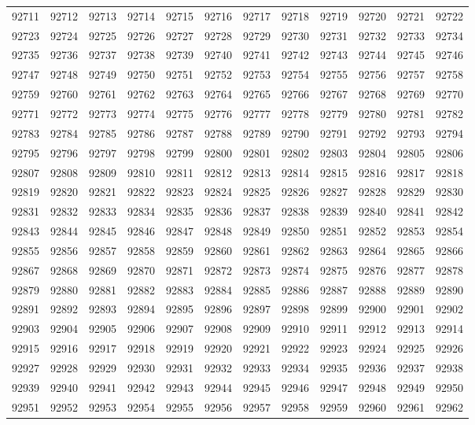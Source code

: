 \begin{center}
\begin{longtable}{llllllllllll}
92711 &92712 &92713 &92714 &92715 &92716 &92717 &92718 &92719 &92720 &92721 &92722 \\
92723 &92724 &92725 &92726 &92727 &92728 &92729 &92730 &92731 &92732 &92733 &92734 \\
92735 &92736 &92737 &92738 &92739 &92740 &92741 &92742 &92743 &92744 &92745 &92746 \\
92747 &92748 &92749 &92750 &92751 &92752 &92753 &92754 &92755 &92756 &92757 &92758 \\
92759 &92760 &92761 &92762 &92763 &92764 &92765 &92766 &92767 &92768 &92769 &92770 \\
92771 &92772 &92773 &92774 &92775 &92776 &92777 &92778 &92779 &92780 &92781 &92782 \\
92783 &92784 &92785 &92786 &92787 &92788 &92789 &92790 &92791 &92792 &92793 &92794 \\
92795 &92796 &92797 &92798 &92799 &92800 &92801 &92802 &92803 &92804 &92805 &92806 \\
92807 &92808 &92809 &92810 &92811 &92812 &92813 &92814 &92815 &92816 &92817 &92818 \\
92819 &92820 &92821 &92822 &92823 &92824 &92825 &92826 &92827 &92828 &92829 &92830 \\
92831 &92832 &92833 &92834 &92835 &92836 &92837 &92838 &92839 &92840 &92841 &92842 \\
92843 &92844 &92845 &92846 &92847 &92848 &92849 &92850 &92851 &92852 &92853 &92854 \\
92855 &92856 &92857 &92858 &92859 &92860 &92861 &92862 &92863 &92864 &92865 &92866 \\
92867 &92868 &92869 &92870 &92871 &92872 &92873 &92874 &92875 &92876 &92877 &92878 \\
92879 &92880 &92881 &92882 &92883 &92884 &92885 &92886 &92887 &92888 &92889 &92890 \\
92891 &92892 &92893 &92894 &92895 &92896 &92897 &92898 &92899 &92900 &92901 &92902 \\
92903 &92904 &92905 &92906 &92907 &92908 &92909 &92910 &92911 &92912 &92913 &92914 \\
92915 &92916 &92917 &92918 &92919 &92920 &92921 &92922 &92923 &92924 &92925 &92926 \\
92927 &92928 &92929 &92930 &92931 &92932 &92933 &92934 &92935 &92936 &92937 &92938 \\
92939 &92940 &92941 &92942 &92943 &92944 &92945 &92946 &92947 &92948 &92949 &92950 \\
92951 &92952 &92953 &92954 &92955 &92956 &92957 &92958 &92959 &92960 &92961 &92962 \\

\end{longtable}
\end{center}

